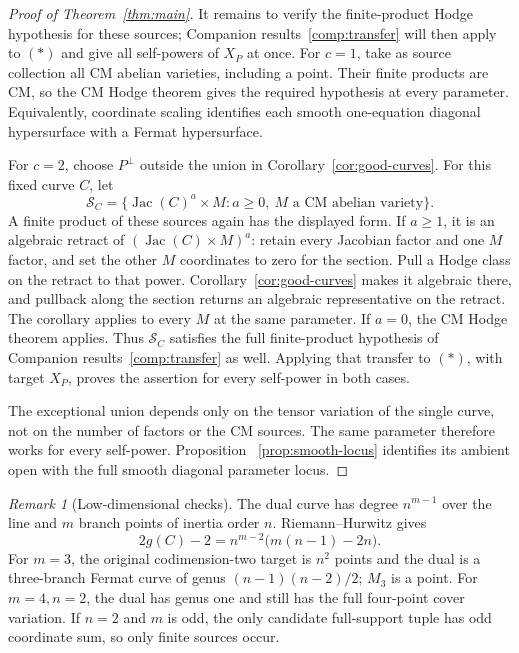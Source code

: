 \documentclass[11pt]{article}
\newcommand{\Jac}{\operatorname{Jac}}
\theoremstyle{plain}
\theoremstyle{definition}
\theoremstyle{remark}
\newtheorem{remark}[theorem]{Remark}
\numberwithin{equation}{section}
\begin{document}
\begin{proof}[Proof of Theorem~\ref{thm:main}]
It remains to verify the finite-product Hodge hypothesis for these
sources; Companion results~\ref{comp:transfer} will then
apply to \((*)\) and give all self-powers of \(X_P\) at once.
For \(c=1\), take as source collection all CM abelian varieties,
including a point.  Their finite products are CM, so the CM Hodge
theorem \cite[Theorem~1.1]{OpenAICM} gives the required hypothesis
at every parameter.  Equivalently, coordinate scaling identifies
each smooth one-equation diagonal hypersurface with a Fermat hypersurface.

For \(c=2\), choose \(P^\perp\) outside the union in
Corollary~\ref{cor:good-curves}.  For this fixed curve \(C\), let
\[
 \mathscr S_C=\{\Jac(C)^a\times M:a\geq0,\ M\text{ a CM abelian variety}\}.
\]
A finite product of these sources again has the displayed form.
If \(a\geq1\), it is an algebraic retract of
\((\Jac(C)\times M)^a\): retain every Jacobian factor and one
\(M\) factor, and set the other \(M\) coordinates to zero for the
section.  Pull a Hodge class on the retract to that power.
Corollary~\ref{cor:good-curves} makes it algebraic there, and pullback
along the section returns an algebraic representative on the retract.
The corollary applies to every \(M\) at the same parameter.  If \(a=0\),
the CM Hodge theorem applies.
Thus \(\mathscr S_C\) satisfies the full finite-product hypothesis of
Companion results~\ref{comp:transfer} as well.  Applying that
transfer to \((*)\), with target \(X_P\), proves the assertion for
every self-power in both cases.

The exceptional union depends only on the tensor variation of
the single curve, not on the number of factors or the CM sources.
The same parameter therefore works for every self-power.  Proposition~
\ref{prop:smooth-locus} identifies its ambient open with the
full smooth diagonal parameter locus.
\end{proof}

\begin{remark}[Low-dimensional checks]
The dual curve has degree \(n^{m-1}\) over the line and \(m\)
branch points of inertia order \(n\).  Riemann--Hurwitz gives
\[
 2g(C)-2=n^{m-2}\bigl(m(n-1)-2n\bigr).
\]
For \(m=3\), the original codimension-two target is \(n^2\)
points and the dual is a three-branch Fermat curve of genus
\((n-1)(n-2)/2\); \(M_3\) is a point.  For \(m=4,n=2\), the
dual has genus one and still has the full four-point cover
variation.  If \(n=2\) and \(m\) is odd, the only candidate
full-support tuple has odd coordinate sum, so only finite
sources occur.
\end{remark}
\end{document}
